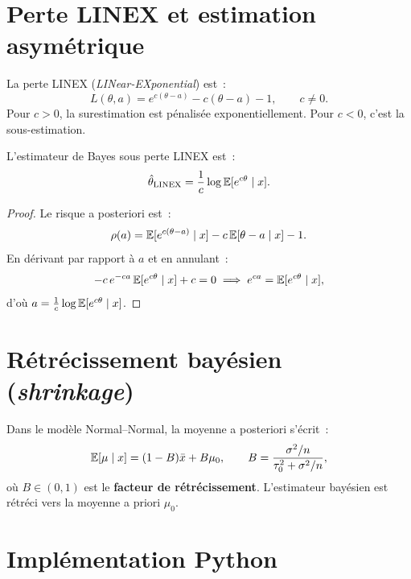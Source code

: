 \section{Perte LINEX et estimation asym\'etrique}

\begin{definition}
La perte LINEX (\textit{LINear-EXponential}) est~:
\[
  L(\theta, a) = e^{c(\theta - a)} - c(\theta - a) - 1, \qquad c \neq 0.
\]
Pour $c > 0$, la surestimation est p\'enalis\'ee exponentiellement.
Pour $c < 0$, c'est la sous-estimation.
\end{definition}

\begin{theoreme}
L'estimateur de Bayes sous perte LINEX est~:
\[
  \hat{\theta}_{\text{LINEX}} = \frac{1}{c}\log \mathbb{E}[e^{c\theta} \mid x].
\]
\end{theoreme}

\begin{proof}
Le risque a posteriori est~:
\[
  \rho(a) = \mathbb{E}[e^{c(\theta-a)} \mid x] - c\,\mathbb{E}[\theta - a \mid x] - 1.
\]
En d\'erivant par rapport \`a $a$ et en annulant~:
\[
  -c\,e^{-ca}\,\mathbb{E}[e^{c\theta} \mid x] + c = 0
  \implies e^{ca} = \mathbb{E}[e^{c\theta} \mid x],
\]
d'o\`u $a = \frac{1}{c}\log \mathbb{E}[e^{c\theta} \mid x]$.
\end{proof}

\section{R\'etr\'ecissement bay\'esien (\textit{shrinkage})}

\begin{proposition}
Dans le mod\`ele Normal--Normal, la moyenne a posteriori s'\'ecrit~:
\[
  \mathbb{E}[\mu \mid x] = (1 - B)\bar{x} + B\mu_0,
  \qquad B = \frac{\sigma^2/n}{\tau_0^2 + \sigma^2/n},
\]
o\`u $B \in (0,1)$ est le \textbf{facteur de r\'etr\'ecissement}.
L'estimateur bay\'esien est r\'etr\'eci vers la moyenne a priori $\mu_0$.
\end{proposition}

\section{Impl\'ementation Python}

